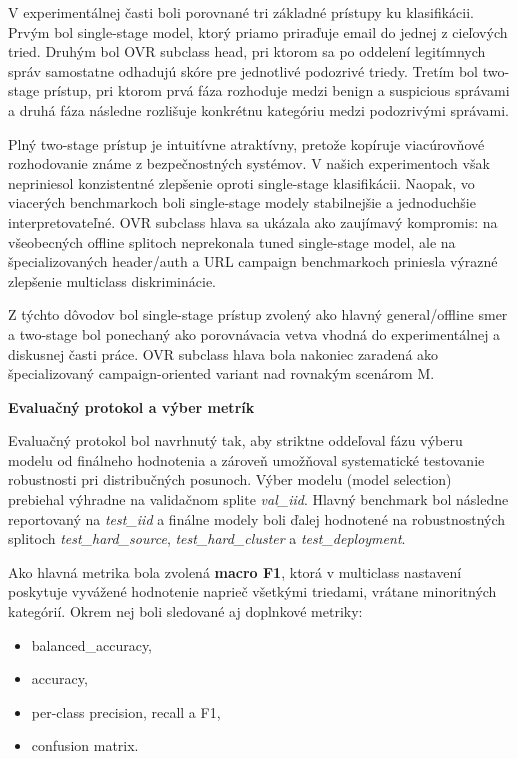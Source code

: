 \documentclass[conference]{IEEEtran}
\begin{document}
V experimentálnej časti boli porovnané tri základné prístupy ku klasifikácii. Prvým bol single-stage model, ktorý priamo priraďuje email do jednej z cieľových tried. Druhým bol OVR subclass head, pri ktorom sa po oddelení legitímnych správ samostatne odhadujú skóre pre jednotlivé podozrivé triedy. Tretím bol two-stage prístup, pri ktorom prvá fáza rozhoduje medzi benign a suspicious správami a druhá fáza následne rozlišuje konkrétnu kategóriu medzi podozrivými správami.

Plný two-stage prístup je intuitívne atraktívny, pretože kopíruje viacúrovňové rozhodovanie známe z bezpečnostných systémov. V našich experimentoch však nepriniesol konzistentné zlepšenie oproti single-stage klasifikácii. Naopak, vo viacerých benchmarkoch boli single-stage modely stabilnejšie a jednoduchšie interpretovateľné. OVR subclass hlava sa ukázala ako zaujímavý kompromis: na všeobecných offline splitoch neprekonala tuned single-stage model, ale na špecializovaných header/auth a URL campaign benchmarkoch priniesla výrazné zlepšenie multiclass diskriminácie.

Z týchto dôvodov bol single-stage prístup zvolený ako hlavný general/offline smer a two-stage bol ponechaný ako porovnávacia vetva vhodná do experimentálnej a diskusnej časti práce. OVR subclass hlava bola nakoniec zaradená ako špecializovaný campaign-oriented variant nad rovnakým scenárom M.

\textbf{Evaluačný protokol a výber metrík}

Evaluačný protokol bol navrhnutý tak, aby striktne oddeľoval fázu výberu modelu od finálneho hodnotenia a zároveň umožňoval systematické testovanie robustnosti pri distribučných posunoch. Výber modelu (model selection) prebiehal výhradne na validačnom splite \textit{val\_iid}. Hlavný benchmark bol následne reportovaný na \textit{test\_iid} a finálne modely boli ďalej hodnotené na robustnostných splitoch \textit{test\_hard\_source}, \textit{test\_hard\_cluster} a \textit{test\_deployment}.

Ako hlavná metrika bola zvolená \textbf{macro F1}, ktorá v multiclass nastavení poskytuje vyvážené hodnotenie naprieč všetkými triedami, vrátane minoritných kategórií. Okrem nej boli sledované aj doplnkové metriky:

\begin{itemize}
    \item balanced\_accuracy,
    \item accuracy,
    \item per-class precision, recall a F1,
    \item confusion matrix.
\end{itemize}
\end{document}
